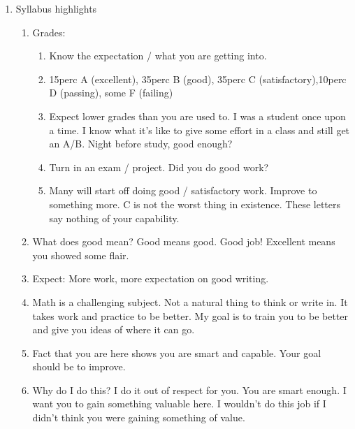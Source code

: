 \documentclass{article}
\begin{document}
\begin{enumerate}
\item Syllabus highlights
\begin{enumerate}
\item Grades: 
\begin{enumerate}
\item Know the expectation / what you are getting into.
\item 15perc A (excellent), 35perc B (good), 35perc C (satisfactory),10perc D (passing), some F (failing)
\item Expect lower grades than you are used to. I was a student once upon a time. I know what it's like to give some effort in a class and still get an A/B. Night before study, good enough? 
\item Turn in an exam / project. Did you do good work?
\item Many will start off doing good / satisfactory work. Improve to something more. C is not the worst thing in existence. These letters say nothing of your capability. 
\end{enumerate}
\item What does good mean? Good means good. Good job! Excellent means you showed some flair.
\item Expect: More work, more expectation on good writing.
\item Math is a challenging subject. Not a natural thing to think or write in. It takes work and practice to be better. My goal is to train you to be better and give you ideas of where it can go.
\item Fact that you are here shows you are smart and capable. Your goal should be to improve. 
\item Why do I do this? I do it out of respect for you. You are smart enough. I want you to gain something valuable here. I wouldn't do this job if I didn't think you were gaining something of value.
\end{enumerate}


\end{enumerate}
\end{document}
